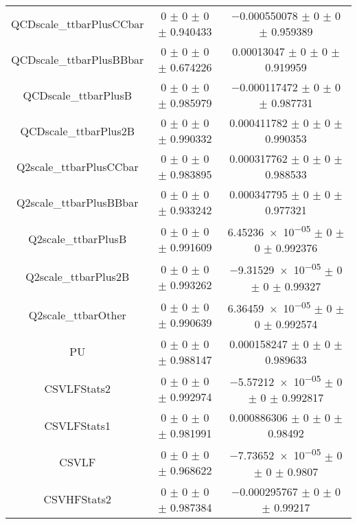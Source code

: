 \begin{table}
\begin{tabular}{ccc}
QCDscale\_ttbarPlusCCbar & \num{0} $\pm$ \num{0} $\pm$ \num{0} $\pm$ \num{0.940433} & \num{-0.000550078} $\pm$ \num{0} $\pm$ \num{0} $\pm$ \num{0.959389}\\
QCDscale\_ttbarPlusBBbar & \num{0} $\pm$ \num{0} $\pm$ \num{0} $\pm$ \num{0.674226} & \num{0.00013047} $\pm$ \num{0} $\pm$ \num{0} $\pm$ \num{0.919959}\\
QCDscale\_ttbarPlusB & \num{0} $\pm$ \num{0} $\pm$ \num{0} $\pm$ \num{0.985979} & \num{-0.000117472} $\pm$ \num{0} $\pm$ \num{0} $\pm$ \num{0.987731}\\
QCDscale\_ttbarPlus2B & \num{0} $\pm$ \num{0} $\pm$ \num{0} $\pm$ \num{0.990332} & \num{0.000411782} $\pm$ \num{0} $\pm$ \num{0} $\pm$ \num{0.990353}\\
Q2scale\_ttbarPlusCCbar & \num{0} $\pm$ \num{0} $\pm$ \num{0} $\pm$ \num{0.983895} & \num{0.000317762} $\pm$ \num{0} $\pm$ \num{0} $\pm$ \num{0.988533}\\
Q2scale\_ttbarPlusBBbar & \num{0} $\pm$ \num{0} $\pm$ \num{0} $\pm$ \num{0.933242} & \num{0.000347795} $\pm$ \num{0} $\pm$ \num{0} $\pm$ \num{0.977321}\\
Q2scale\_ttbarPlusB & \num{0} $\pm$ \num{0} $\pm$ \num{0} $\pm$ \num{0.991609} & \num{6.45236e-05} $\pm$ \num{0} $\pm$ \num{0} $\pm$ \num{0.992376}\\
Q2scale\_ttbarPlus2B & \num{0} $\pm$ \num{0} $\pm$ \num{0} $\pm$ \num{0.993262} & \num{-9.31529e-05} $\pm$ \num{0} $\pm$ \num{0} $\pm$ \num{0.99327}\\
Q2scale\_ttbarOther & \num{0} $\pm$ \num{0} $\pm$ \num{0} $\pm$ \num{0.990639} & \num{6.36459e-05} $\pm$ \num{0} $\pm$ \num{0} $\pm$ \num{0.992574}\\
PU & \num{0} $\pm$ \num{0} $\pm$ \num{0} $\pm$ \num{0.988147} & \num{0.000158247} $\pm$ \num{0} $\pm$ \num{0} $\pm$ \num{0.989633}\\
CSVLFStats2 & \num{0} $\pm$ \num{0} $\pm$ \num{0} $\pm$ \num{0.992974} & \num{-5.57212e-05} $\pm$ \num{0} $\pm$ \num{0} $\pm$ \num{0.992817}\\
CSVLFStats1 & \num{0} $\pm$ \num{0} $\pm$ \num{0} $\pm$ \num{0.981991} & \num{0.000886306} $\pm$ \num{0} $\pm$ \num{0} $\pm$ \num{0.98492}\\
CSVLF & \num{0} $\pm$ \num{0} $\pm$ \num{0} $\pm$ \num{0.968622} & \num{-7.73652e-05} $\pm$ \num{0} $\pm$ \num{0} $\pm$ \num{0.9807}\\
CSVHFStats2 & \num{0} $\pm$ \num{0} $\pm$ \num{0} $\pm$ \num{0.987384} & \num{-0.000295767} $\pm$ \num{0} $\pm$ \num{0} $\pm$ \num{0.99217}\\

\end{tabular}
\end{table}
